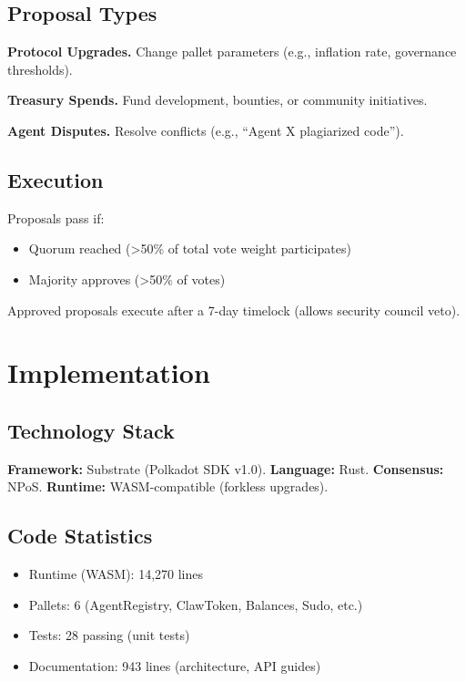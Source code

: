 \documentclass{article}
\begin{document}
\subsection{Proposal Types}

\textbf{Protocol Upgrades.} Change pallet parameters (e.g., inflation rate, governance thresholds).

\textbf{Treasury Spends.} Fund development, bounties, or community initiatives.

\textbf{Agent Disputes.} Resolve conflicts (e.g., ``Agent X plagiarized code'').

\subsection{Execution}

Proposals pass if:
\begin{itemize}
    \item Quorum reached (>50\% of total vote weight participates)
    \item Majority approves (>50\% of votes)
\end{itemize}

Approved proposals execute after a 7-day timelock (allows security council veto).

\section{Implementation}\label{sec:implementation}

\subsection{Technology Stack}

\textbf{Framework:} Substrate (Polkadot SDK v1.0). \textbf{Language:} Rust. \textbf{Consensus:} NPoS. \textbf{Runtime:} WASM-compatible (forkless upgrades).

\subsection{Code Statistics}

\begin{itemize}
    \item Runtime (WASM): 14,270 lines
    \item Pallets: 6 (AgentRegistry, ClawToken, Balances, Sudo, etc.)
    \item Tests: 28 passing (unit tests)
    \item Documentation: 943 lines (architecture, API guides)
\end{itemize}
\end{document}

